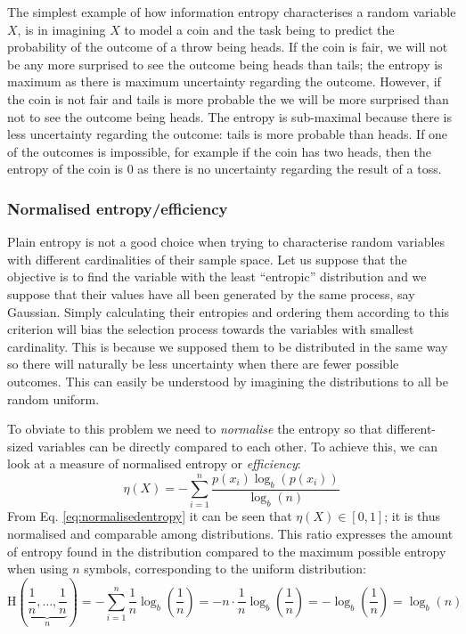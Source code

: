 The simplest example of how information entropy characterises a random variable $X$, is in imagining $X$ to model a coin and the task being to predict the probability of the outcome of a throw being heads.
If the coin is fair, we will not be any more surprised to see the outcome being heads than tails; the entropy is maximum as there is maximum uncertainty regarding the outcome.
However, if the coin is not fair and tails is more probable the we will be more surprised than not to see the outcome being heads.  
The entropy is sub-maximal because there is less uncertainty regarding the outcome: tails is more probable than heads.
If one of the outcomes is impossible, for example if the coin has two heads, then the entropy of the coin is $0$ as there is no uncertainty regarding the result of a toss.

\subsubsection{Normalised entropy/efficiency}
Plain entropy is not a good choice when trying to characterise random variables with different cardinalities of their sample space.
Let us suppose that the objective is to find the variable with the least \enquote{entropic} distribution and we suppose that their values have all been generated by the same process, say Gaussian.
Simply calculating their entropies and ordering them according to this criterion will bias the selection process towards the variables with smallest cardinality.
This is because we supposed them to be distributed in the same way so there will naturally be less uncertainty when there are fewer possible outcomes.
This can easily be understood by imagining the distributions to all be random uniform.

To obviate to this problem we need to \textit{normalise} the entropy so that different-sized variables can be directly compared to each other.
To achieve this, we can look at a measure of normalised entropy or \textit{efficiency}:
\begin{equation} \label{eq:normalisedentropy}
 	\eta(X)=-\sum_{i=1}^{n} \frac{p\left(x_{i}\right) \log _{b}\left(p\left(x_{i}\right)\right)}{\log _{b}(n)}
\end{equation}
From Eq. \ref{eq:normalisedentropy} it can be seen that $\eta(X) \in [0,1]$; it is thus normalised and comparable among distributions.
This ratio expresses the amount of entropy found in the distribution compared to the maximum possible entropy when using $n$ symbols, corresponding to the uniform distribution:
\begin{equation}
\mathrm{H}\left(\underbrace{\frac{1}{n}, \ldots, \frac{1}{n}}_{n}\right) = - \sum_{i=1}^n \frac{1}{n} \log _{b} \left( \frac{1}{n} \right) = -n \cdot \frac{1}{n} \log _{b} \left( \frac{1}{n} \right) = - \log _{b} \left( \frac{1}{n} \right) = \log _{b}(n) 
\end{equation}   
